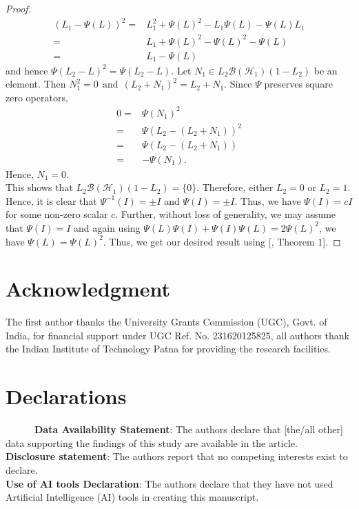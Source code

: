 \documentclass{amsart}
\theoremstyle{definition}
\theoremstyle{remark}
\numberwithin{equation}{section}
\begin{document}
\begin{proof}
\begin{align*}
    (L_1-\Psi(L))^2=& L_1^2+\Psi(L)^2-L_1\Psi(L)-\Psi(L)L_1\\
                      =& L_1+\Psi(L)^2-\Psi(L)^2-\Psi(L)\\
                      =&L_1-\Psi(L)
\end{align*}
and hence $\Psi(L_2-L)^2=\Psi(L_2-L)$.
Let $N_1 \in L_2\mathscr{B}(\mathscr{H}_1)(1-L_2)$ be an element. Then $ N_1^2=0 ~~\text{and}~~(L_2+N_1)^2=L_2+N_1.$ Since $\Psi$ preserves square zero operators,
\begin{align*}
    0=&\Psi(N_1)^2\\
    =&\Psi(L_2-(L_2+N_1))^2\\
    =&\Psi(L_2-(L_2+N_1))\\
    =&-\Psi(N_1).
\end{align*}
Hence, $N_1=0.$\\
This shows that $L_2\mathscr{B}(\mathscr{H}_1)(1-L_2)=\{0\}$. Therefore, either $L_2=0$ or $L_2=1$. Hence, it is clear that $\Psi^{-1}(I)=\pm I$ and $\Psi(I)=\pm I$. Thus, we have $\Psi(I)=cI$ for some non-zero scalar $c$. Further, without loss of generality, we may assume that $\Psi(I)=I$ and again using $\Psi(L)\Psi(I)+\Psi(I)\Psi(L)=2\Psi(L)^2$, we have $\Psi(L)=\Psi(L)^2$. Thus, we get our desired result using [\cite{bre3}, Theorem 1].
\end{proof}	

\section*{Acknowledgment}
The first author thanks the University Grants Commission (UGC), Govt. of India, for financial support under UGC Ref. No. 231620125825, all authors thank the Indian Institute of Technology Patna for providing the research facilities.

\section*{Declarations}
~~~~~~\textbf{Data Availability Statement}: The authors declare that [the/all other] data supporting the findings of this study are available in the article.\\

\textbf{Disclosure statement}: The authors report that no competing interests exist to declare.\\

\textbf{Use of AI tools Declaration}: The authors declare that they have not used Artificial Intelligence (AI) tools in creating this manuscript. 
	
\end{document}
